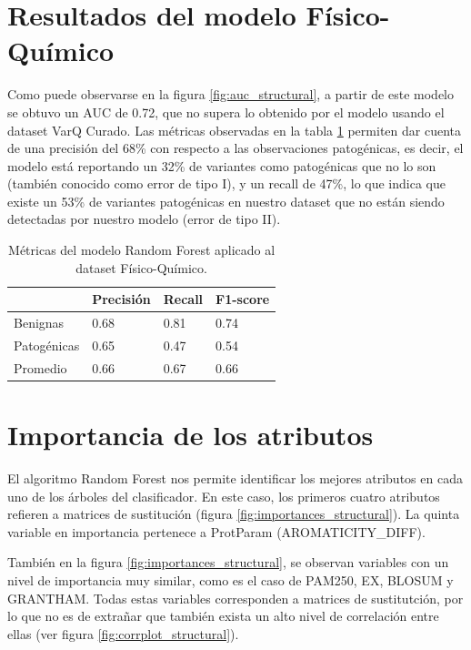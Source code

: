 \section{Resultados del modelo Físico-Químico}

Como puede observarse en la figura \ref{fig:auc_structural}, a partir de este modelo se obtuvo un AUC de 0.72, que no supera lo obtenido por el modelo usando el dataset VarQ Curado. Las métricas observadas en la tabla \ref{structural_table} permiten dar cuenta de una precisión del 68\% con respecto a las observaciones patogénicas, es decir, el modelo está reportando un 32\% de variantes como patogénicas que no lo son (también conocido como error de tipo I), y un recall de 47\%, lo que indica que existe un 53\% de variantes patogénicas en nuestro dataset que no están siendo detectadas por nuestro modelo (error de tipo II). 

\begin{table}[H]
\centering
\begin{tabular}{|l|l|l|l|}
\hline
              & Precisión & Recall & F1-score \\ \hline
Benignas      & 0.68      & 0.81   & 0.74     \\ \hline
Patogénicas   & 0.65      & 0.47   & 0.54     \\ \hline
Promedio      & 0.66      & 0.67   & 0.66     \\ \hline
\end{tabular}
\caption{Métricas del modelo Random Forest aplicado al dataset Físico-Químico.}
\label{structural_table}
\end{table}


\section{Importancia de los atributos}

El algoritmo Random Forest nos permite identificar los mejores atributos en cada uno de los árboles del clasificador. En este caso, los primeros cuatro atributos refieren a matrices de sustitución (figura \ref{fig:importances_structural}). La quinta variable en importancia pertenece a ProtParam (AROMATICITY\_DIFF). 

También en la figura \ref{fig:importances_structural}, se observan variables con un nivel de importancia muy similar, como es el caso de PAM250, EX, BLOSUM y GRANTHAM. Todas estas variables corresponden a matrices de sustitutción, por lo que no es de extrañar que también exista un alto nivel de correlación entre ellas (ver figura \ref{fig:corrplot_structural}). 

